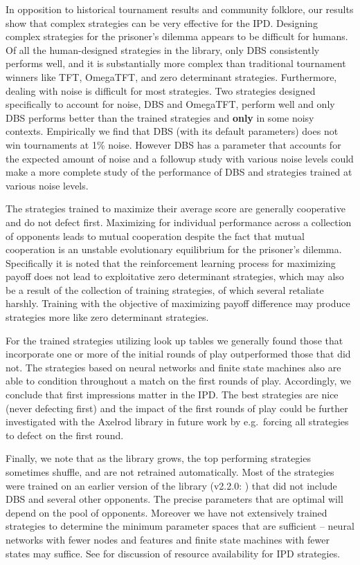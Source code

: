 \documentclass{article}
\begin{document}
In opposition to historical tournament results and community folklore,
our results show that complex strategies can be very effective for the
IPD\@. Designing complex strategies for the prisoner's dilemma appears to be
difficult for humans. Of all the human-designed
strategies in the library, only DBS consistently performs well, and it is
substantially more complex than traditional tournament winners like TFT, OmegaTFT,
and zero determinant strategies. Furthermore, dealing with noise is difficult
for most strategies. Two strategies designed specifically to account for noise,
DBS and OmegaTFT, perform well and only DBS performs better than the trained
strategies and \textbf{only} in some noisy contexts. Empirically we find that
DBS (with its default parameters) does not win tournaments at 1\% noise.
However DBS has a parameter that accounts for the expected amount of noise and a
followup study with various noise levels could make a more complete study of
the performance of DBS and strategies trained at various noise levels.

The strategies trained to maximize their average score are generally
cooperative and do not defect first. Maximizing for individual
performance across a collection of opponents leads to mutual cooperation despite
the fact that mutual cooperation is an unstable evolutionary equilibrium for the prisoner's
dilemma. Specifically it is noted that the reinforcement learning process for maximizing
payoff does not lead to exploitative zero determinant strategies, which may also
be a result of the collection of training strategies, of which several retaliate
harshly. Training with the objective of maximizing payoff difference may
produce strategies more like zero determinant strategies.

For the trained
strategies utilizing look up tables we generally found those that incorporate
one or more of the initial rounds of play outperformed those that did not. The
strategies based on neural networks and finite state machines also are able to
condition throughout a match on the first rounds of play. Accordingly, we conclude
that first impressions matter in the IPD\@. The best strategies are nice (never
defecting first) and the impact of the first rounds of play could be further
investigated with the Axelrod library
in future work by e.g.\ forcing all strategies to defect on the first round.

Finally, we note that as the library grows, the top performing strategies
sometimes shuffle, and are not retrained automatically. Most of the strategies were
trained on an earlier version of the library (v2.2.0: \cite{axelrodproject2.2})
that did not include DBS and several other opponents. The precise parameters
that are optimal will depend on the pool of opponents. Moreover we have not
extensively trained strategies to determine the minimum parameter spaces that are
sufficient -- neural networks with fewer nodes and features and finite state
machines with fewer states may suffice. See \cite{ashlock2013impact} for
discussion of resource availability for IPD strategies.
\end{document}
